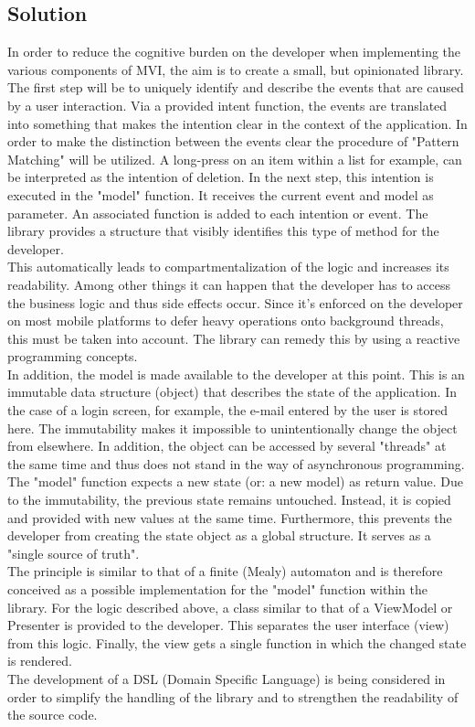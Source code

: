 \subsection{Solution}
\label{subsec:solution}

In order to reduce the cognitive burden on the developer when implementing the various components of MVI, the aim 
is to create a small, but opinionated library.
\\
The first step will be to uniquely identify and describe the events that are caused by a user interaction.
Via a provided intent function, the events are translated into something that makes the intention clear in the context of the application.
In order to make the distinction between the events clear the procedure of "Pattern Matching" will be utilized. A long-press on an item within a list for example, 
can be interpreted as the intention of deletion. In the next step, this intention is executed in the "model" function. It receives the current event and model 
as parameter. An associated function is added to each intention or event. The library provides a structure that visibly identifies this type of method for the developer.
\\
This automatically leads to compartmentalization of the logic and increases its readability. Among other things it can happen that the developer has to access the business 
logic and thus side effects occur. Since it's enforced on the developer on most mobile platforms to defer heavy operations onto background threads, this must be taken
into account. The library can remedy this by using a reactive programming concepts.
\\
In addition, the model is made available to the developer
at this point. This is an immutable data structure (object) that describes the state of the application. In the case of a login screen, for example, the e-mail 
entered by the user is stored here. The immutability makes it impossible to unintentionally change the object from elsewhere. In addition, the object can be accessed 
by several "threads" at the same time and thus does not stand in the way of asynchronous programming. The "model" function expects a new state (or: a new model) 
as return value. Due to the immutability, the previous state remains untouched. Instead, it is copied and provided with new values at the same time. Furthermore, 
this prevents the developer from creating the state object as a global structure. It serves as a "single source of truth".
\\
The principle is similar to that of a finite (Mealy) automaton and is therefore conceived as a possible implementation for the "model" function within the library. 
For the logic described above, a class similar to that of a ViewModel or Presenter is provided to the developer. This separates the user interface (view) from this logic.
Finally, the view gets a single function in which the changed state is rendered.
\\
The development of a DSL (Domain Specific Language) is being considered in order to simplify the handling of the library and to strengthen the readability 
of the source code.


